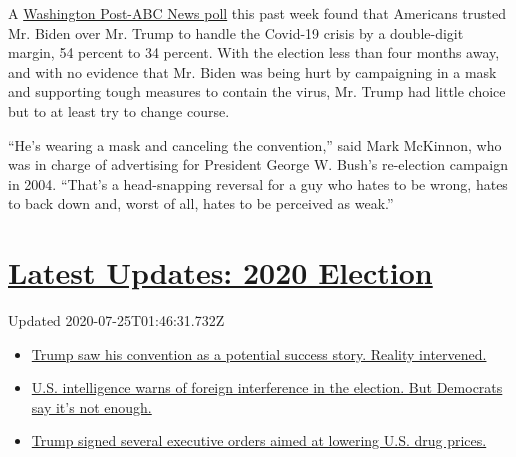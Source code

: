 A
\href{https://www.washingtonpost.com/context/july-12-15-2020-washington-post-abc-news-poll/05fce27c-2660-4808-9f10-e5bda90e3faa/?itid=lk_inline_manual_2}{Washington
Post-ABC News poll} this past week found that Americans trusted Mr.
Biden over Mr. Trump to handle the Covid-19 crisis by a double-digit
margin, 54 percent to 34 percent. With the election less than four
months away, and with no evidence that Mr. Biden was being hurt by
campaigning in a mask and supporting tough measures to contain the
virus, Mr. Trump had little choice but to at least try to change course.

``He's wearing a mask and canceling the convention,'' said Mark
McKinnon, who was in charge of advertising for President George W.
Bush's re-election campaign in 2004. ``That's a head-snapping reversal
for a guy who hates to be wrong, hates to back down and, worst of all,
hates to be perceived as weak.''

\hypertarget{latest-updates-2020-election}{%
\section{\texorpdfstring{\href{https://www.nytimes3xbfgragh.onion/2020/07/24/us/elections/2020-presidential-election.html?action=click\&pgtype=Article\&state=default\&module=styln-elections-2020\&region=MAIN_CONTENT_1\&context=storylines_live_updates}{Latest
Updates: 2020
Election}}{Latest Updates: 2020 Election}}\label{latest-updates-2020-election}}

Updated 2020-07-25T01:46:31.732Z

\begin{itemize}
\tightlist
\item
  \href{https://www.nytimes3xbfgragh.onion/2020/07/24/us/elections/2020-presidential-election.html?action=click\&pgtype=Article\&state=default\&module=styln-elections-2020\&region=MAIN_CONTENT_1\&context=storylines_live_updates\#link-52155c51}{Trump
  saw his convention as a potential success story. Reality intervened.}
\item
  \href{https://www.nytimes3xbfgragh.onion/2020/07/24/us/elections/2020-presidential-election.html?action=click\&pgtype=Article\&state=default\&module=styln-elections-2020\&region=MAIN_CONTENT_1\&context=storylines_live_updates\#link-628390e8}{U.S.
  intelligence warns of foreign interference in the election. But
  Democrats say it's not enough.}
\item
  \href{https://www.nytimes3xbfgragh.onion/2020/07/24/us/elections/2020-presidential-election.html?action=click\&pgtype=Article\&state=default\&module=styln-elections-2020\&region=MAIN_CONTENT_1\&context=storylines_live_updates\#link-a66d253}{Trump
  signed several executive orders aimed at lowering U.S. drug prices.}
\end{itemize}

